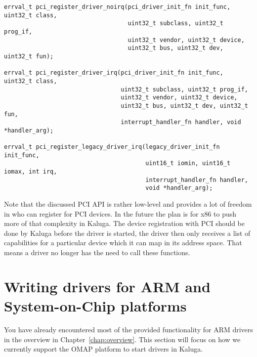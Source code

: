 \documentclass[a4paper,11pt,twoside]{report}
\begin{document}
\begin{lstlisting}[caption={A driver uses one of the following functions to register for PCI devices.}, label={lst:pciapi}]
errval_t pci_register_driver_noirq(pci_driver_init_fn init_func, uint32_t class,
                                   uint32_t subclass, uint32_t prog_if,
                                   uint32_t vendor, uint32_t device,
                                   uint32_t bus, uint32_t dev, uint32_t fun);

errval_t pci_register_driver_irq(pci_driver_init_fn init_func, uint32_t class,
                                 uint32_t subclass, uint32_t prog_if,
                                 uint32_t vendor, uint32_t device,
                                 uint32_t bus, uint32_t dev, uint32_t fun,
                                 interrupt_handler_fn handler, void *handler_arg);

errval_t pci_register_legacy_driver_irq(legacy_driver_init_fn init_func,
                                        uint16_t iomin, uint16_t iomax, int irq,
                                        interrupt_handler_fn handler,
                                        void *handler_arg);
\end{lstlisting}

Note that the discussed PCI API is rather low-level and provides a lot of
freedom in who can register for PCI devices. In the future the plan is for x86
to push more of that complexity in Kaluga. The device registration with PCI
should be done by Kaluga before the driver is started, the driver then only
receives a list of capabilities for a particular device which it can map in
its address space. That means a driver no longer has the need to call these
functions.

\section{Writing drivers for ARM and System-on-Chip platforms}
\label{sec:armdriverwriting}

You have already encountered most of the provided functionality for ARM
drivers in the overview in Chapter~\ref{chap:overview}. This section
will focus on how we currently support the OMAP platform to start
drivers in Kaluga.
\end{document}
